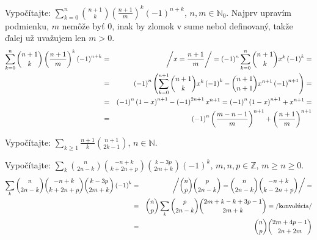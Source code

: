 \pr Vypočítajte: $\sum_{k=0}^{n}{n+1 \choose k}\left(\frac{n+1}m\right)^k \left(-1\right)^{n+k}$, $n,m\in\mathbb{N}_0$.
 Najprv upravím podmienku, $m$ nemôže byť $0$, inak by zlomok v sume nebol definovaný, takže ďalej už uvažujem len $m>0$.
\begin{eqnarray*}
\sum_{k=0}^{n}{n+1 \choose k}\left(\frac{n+1}m\right)^k \left(-1\right)^{n+k} &=& \left/ x = \frac{n+1}m \right/ = \left(-1\right)^n\sum_{k=0}^n{n+1 \choose k}x^k\left(-1\right)^k =\\
&=& \left(-1\right)^n\left(\sum_{k=0}^{n+1}{n+1 \choose k}x^k\left(-1\right)^k - {n+1 \choose n+1}x^{n+1}\left(-1\right)^{n+1}\right) = \\
&=& \left(-1\right)^n\left(1-x\right)^{n+1} - \left(-1\right)^{2n+1}x^{n+1} = \left(-1\right)^n\left(1-x\right)^{n+1}+x^{n+1} = \\
&=& \left(-1\right)^n\left(\frac{m-n-1}m\right)^{n+1}+\left(\frac{n+1}m\right)^{n+1}
\end{eqnarray*}

\pr Vypočítajte: $\sum_{k\geq1}\frac{n+1}k{n+1 \choose 2k-1}$, $n\in\mathbb{N}$.

\pr Vypočítajte: $\sum_k{n \choose 2n-k}{-n+k \choose k+2n+p}{k-3p \choose 2m+k}\left(-1\right)^k$, $m,n,p\in\mathbb{Z}$, $m\geq n\geq 0$.
\begin{eqnarray*}
\sum_k{n \choose 2n-k}{-n+k \choose k+2n+p}{k-3p \choose 2m+k}\left(-1\right)^k &=& \left/ {n \choose p}{p \choose 2n-k} = {n \choose 2n-k}{-n+k \choose k-2n+p}\right/ = \\
&=& {n \choose p}\sum_k{p \choose 2n-k}{2m+k-k+3p-1 \choose 2m+k} = \left/\hbox{konvolúcia}\right/\\
&=& {n \choose p}{2m+4p-1 \choose 2n+2m}
\end{eqnarray*}

